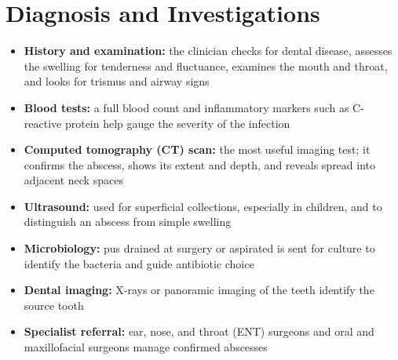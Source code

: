 \section*{Diagnosis and Investigations}
\begin{itemize}
    \item \textbf{History and examination:} the clinician checks for dental disease, assesses the swelling for tenderness and fluctuance, examines the mouth and throat, and looks for trismus and airway signs
    \item \textbf{Blood tests:} a full blood count and inflammatory markers such as C-reactive protein help gauge the severity of the infection
    \item \textbf{Computed tomography (CT) scan:} the most useful imaging test; it confirms the abscess, shows its extent and depth, and reveals spread into adjacent neck spaces
    \item \textbf{Ultrasound:} used for superficial collections, especially in children, and to distinguish an abscess from simple swelling
    \item \textbf{Microbiology:} pus drained at surgery or aspirated is sent for culture to identify the bacteria and guide antibiotic choice
    \item \textbf{Dental imaging:} X-rays or panoramic imaging of the teeth identify the source tooth
    \item \textbf{Specialist referral:} ear, nose, and throat (ENT) surgeons and oral and maxillofacial surgeons manage confirmed abscesses
\end{itemize}

